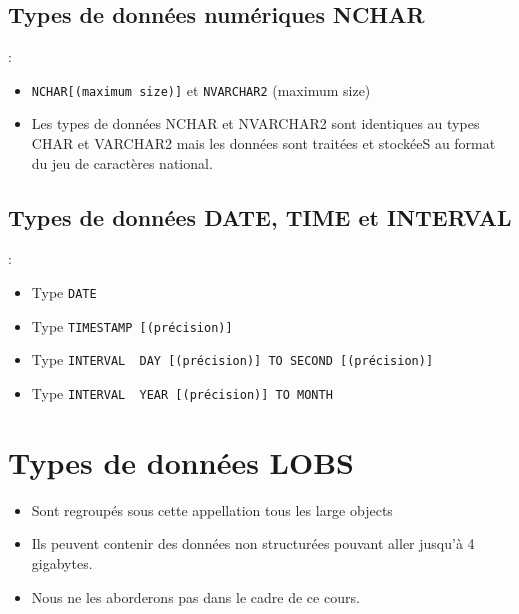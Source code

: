 \documentclass[10pt]{beamer}
\begin{document}
\subsection{Types de données numériques NCHAR}
\begin{frame}{\secname : \subsecname}
    \begin{itemize}
        \item \lstinline[language=xml]!NCHAR[(maximum size)]! et \lstinline[language=xml]!NVARCHAR2! (maximum size)
        \item Les types de données NCHAR et NVARCHAR2 sont identiques au types CHAR et VARCHAR2 mais les données sont traitées et stockéeS au format du jeu de caractères national.
    \end{itemize}
\end{frame}

\subsection{Types de données DATE, TIME et INTERVAL}
\begin{frame}{\secname : \subsecname}
    \begin{itemize}
        \item Type \lstinline[language=xml]!DATE!
        \item Type \lstinline[language=xml]!TIMESTAMP [(précision)]!
        \item Type \lstinline[language=xml]!INTERVAL  DAY [(précision)] TO SECOND [(précision)]!
        \item Type \lstinline[language=xml]!INTERVAL  YEAR [(précision)] TO MONTH!
    \end{itemize}
\end{frame}

\section{Types de données LOBS}
\begin{frame}{\secname}
    \begin{itemize}
        \item Sont regroupés sous cette appellation tous les large objects
        \item Ils peuvent contenir des données non structurées pouvant aller jusqu'à 4 gigabytes.
        \item Nous ne les aborderons pas dans le cadre de ce cours.
    \end{itemize}
\end{frame}
\end{document}
